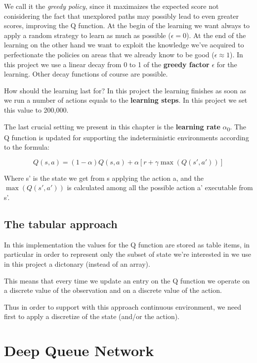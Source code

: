 \documentclass{article}
\begin{document}
We call it the \emph{greedy policy}, since it maximaizes the expected score not conisidering the fact that unexplored paths may
possibly lead to even greater scores, improving the Q function.
At the begin of the learning we want always to apply a random strategy to learn as much as possible ($\epsilon = 0$).
At the end of the learning on the other hand we want to exploit the knowledge we've acquired to perfectionate the policies on areas
that we already know to be good ($\epsilon \approx 1$).
In this project we use a linear decay from 0 to 1 of the \textbf{greedy factor} $\epsilon$ for the learning.
Other decay functions of course are possible.

How should the learning last for? In this project the learning finishes as soon as we run a number of actions
equals to the \textbf{learning steps}. In this project we set this value to 200,000.

The last crucial setting we present in this chapter is the \textbf{learning rate} $\alpha$\textsubscript{0}.
The Q function is updated for supporting the indeterministic environments according to the formula:

\begin{equation}
  Q(s,a) = (1 - \alpha) Q(s,a) + \alpha [r + \gamma \max (Q(s',a'))]
\end{equation}

Where s' is the state we get from s applying the action a, 
and the $\max (Q(s',a'))$ is calculated among all the possible action a' executable from s'.

\subsection{The tabular approach}

In this implementation the values for the Q function are stored as table items,
in particular in order to represent only the subset of state we're interested in we use 
in this project a dictonary (instead of an array).

This means that every time we update an entry on the Q function we operate on a discrete value of the
observation and on a discrete value of the action.

Thus in order to support with this approach continuous environment,
we need first to apply a discretize of the state (and/or the action).



\section{Deep Queue Network}
\end{document}
